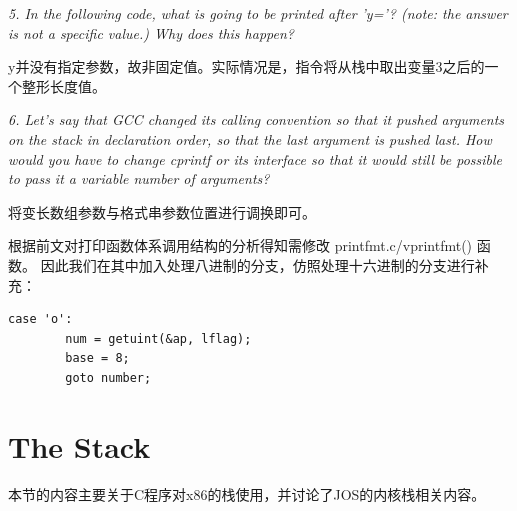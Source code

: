 \documentclass[12pt, letterpaper]{report}
\begin{document}
\textsl{5. In the following code, what is going to be printed after 'y='? 
        (note: the answer is not a specific value.) Why does this happen?} \par
\quad \par 
y并没有指定参数，故非固定值。实际情况是，指令将从栈中取出变量3之后的一个整形长度值。\par 
\quad \par

\textsl{6. Let's say that GCC changed its calling convention so that 
        it pushed arguments on the stack in declaration order, 
        so that the last argument is pushed last. 
        How would you have to change cprintf or its interface so that 
        it would still be possible to pass it a variable number of arguments?} \par
\quad \par 
将变长数组参数与格式串参数位置进行调换即可。
\quad \par 


根据前文对打印函数体系调用结构的分析得知需修改 printfmt.c/vprintfmt() 函数。
因此我们在其中加入处理八进制的分支，仿照处理十六进制的分支进行补充：
\lstset{style=CStyle}
\setmainfont{Consolas}
\begin{lstlisting}
case 'o':
        num = getuint(&ap, lflag);
        base = 8;
        goto number;
\end{lstlisting}
\setmainfont{Times New Roman}

\section[\large The Stack]{The Stack}
本节的内容主要关于C程序对x86的栈使用，并讨论了JOS的内核栈相关内容。\par 
\end{document}

